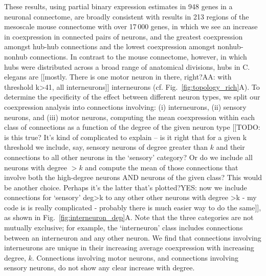 \documentclass[10pt,letterpaper]{article}
\begin{document}
These results, using partial binary expression estimates in 948 genes in a neuronal connectome, are broadly consistent with results in 213 regions of the mesoscale mouse connectome with over 17\,000 genes, in which we see an increase in coexpression in connected pairs of neurons, and the greatest coexpression amongst hub-hub connections and the lowest coexpression amongst nonhub-nonhub connections.
In contrast to the mouse connectome, however, in which hubs were distributed across a broad range of anatomical divisions, hubs in C. elegans are [[mostly. There is one motor neuron in there, right?AA: with threshold k>41, all interneurons]] interneurons \cite{Towlson:2013gf} (cf. Fig.~\ref{fig:topology_rich}A).
To determine the specificity of the effect between different neuron types, we split our coexpression analysis into connections involving: (i) interneurons, (ii) sensory neurons, and (iii) motor neurons, computing the mean coexpression within each class of connections as a function of the degree of the given neuron type
[[TODO: is this true? It's kind of complicated to explain -- is it right that for a given k threshold we include, say, sensory neurons of degree greater than $k$ and their connections to all other neurons in the `sensory' category? Or do we include all neurons with degree $>k$ and compute the mean of those connections that involve both the high-degree neurons AND neurons of the given class? This would be another choice. Perhaps it's the latter that's plotted?YES: now we include connections for `sensory' deg>k to any other other neurons with degree >k - my code is is really complicated - probably there is much easier way to do the same]], as shown in Fig.~\ref{fig:interneuron_dep}A.
Note that the three categories are not mutually exclusive; for example, the `interneuron' class includes connections between an interneuron and any other neuron.
We find that connections involving interneurons are unique in their increasing average coexpression with increasing degree, $k$.
Connections involving motor neurons, and connections involving sensory neurons, do not show any clear increase with degree.
\end{document}

